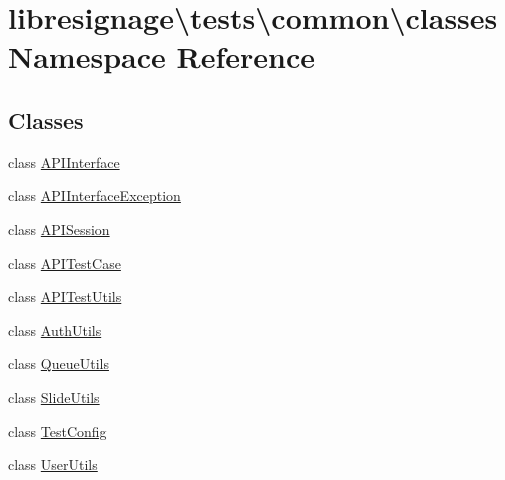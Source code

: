 \hypertarget{namespacelibresignage_1_1tests_1_1common_1_1classes}{}\section{libresignage\textbackslash{}tests\textbackslash{}common\textbackslash{}classes Namespace Reference}
\label{namespacelibresignage_1_1tests_1_1common_1_1classes}
\subsection*{Classes}
\begin{DoxyCompactItemize}
\item 
class \hyperlink{classlibresignage_1_1tests_1_1common_1_1classes_1_1APIInterface}{A\+P\+I\+Interface}
\item 
class \hyperlink{classlibresignage_1_1tests_1_1common_1_1classes_1_1APIInterfaceException}{A\+P\+I\+Interface\+Exception}
\item 
class \hyperlink{classlibresignage_1_1tests_1_1common_1_1classes_1_1APISession}{A\+P\+I\+Session}
\item 
class \hyperlink{classlibresignage_1_1tests_1_1common_1_1classes_1_1APITestCase}{A\+P\+I\+Test\+Case}
\item 
class \hyperlink{classlibresignage_1_1tests_1_1common_1_1classes_1_1APITestUtils}{A\+P\+I\+Test\+Utils}
\item 
class \hyperlink{classlibresignage_1_1tests_1_1common_1_1classes_1_1AuthUtils}{Auth\+Utils}
\item 
class \hyperlink{classlibresignage_1_1tests_1_1common_1_1classes_1_1QueueUtils}{Queue\+Utils}
\item 
class \hyperlink{classlibresignage_1_1tests_1_1common_1_1classes_1_1SlideUtils}{Slide\+Utils}
\item 
class \hyperlink{classlibresignage_1_1tests_1_1common_1_1classes_1_1TestConfig}{Test\+Config}
\item 
class \hyperlink{classlibresignage_1_1tests_1_1common_1_1classes_1_1UserUtils}{User\+Utils}
\end{DoxyCompactItemize}
